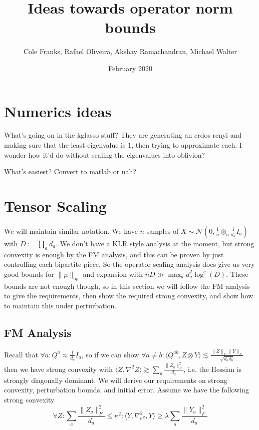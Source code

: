 \documentclass{article}
\title{Ideas towards operator norm bounds}
\author{Cole Franks, Rafael Oliveira, Akshay Ramachandran, Michael Walter}
\date{February 2020}
\begin{document}
\maketitle
\tableofcontents

\section{Numerics ideas}

What's going on in the kglasso stuff? They are generating an erdos renyi and making sure that the least eigenvalue is $1$, then trying to approximate each. I wonder how it'd do without scaling the eigenvalues into oblivion?

What's easiest? Convert to matlab or nah?



\section{Tensor Scaling}
We will maintain similar notation. We have $n$ samples of $X \sim \mathcal{N}(0,\frac{1}{n} \otimes_{a} \frac{1}{d_{a}} I_{a})$ with $D := \prod_{a} d_{a}$. We don't have a KLR style analysis at the moment, but strong convexity is enough by the FM analysis, and this can be proven by just controlling each bipartite piece. So the operator scaling analysis does give us very good bounds for $\|\mu\|_{op}$ and expansion with $nD \gg \max_{a} d_{a}^{2} \log^{c}(D)$. These bounds are not enough though, so in this section we will follow the FM analysis to give the requirements, then show the required strong convexity, and show how to maintain this under perturbation.

\subsection{FM Analysis}
Recall that $\forall a: Q^{a} \approx \frac{1}{d_{a}} I_{a}$, so if we can show $\forall a \neq b: \langle Q^{ab}, Z \otimes Y \rangle \lesssim \frac{\|Z\|_{F} \|Y\|_{F}}{\sqrt{d_{a} d_{b}}}$ then we have strong convexity with $\langle Z, \nabla^{2} Z \rangle \gtrsim \sum_{a} \frac{\|Z_{a}\|_{F}^{2}}{d_{a}}$, i.e. the Hessian is strongly diagonally dominant. We will derive our requirements on strong convexity, perturbation bounds, and initial error. Assume we have the following strong convexity
\[ \forall Z: \sum_{a} \frac{\|Z_{a}\|_{F}^{2}}{d_{a}} \leq \kappa^{2}: \langle Y, \nabla^{2}_{e^{Z}}, Y \rangle \geq \lambda \sum_{a} \frac{\|Y_{a}\|_{F}^{2}}{d_{a}}  \]
\end{document}
